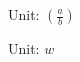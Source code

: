 \documentclass{ctexart}
\begin{document}
Unit: $ \left(\frac{a}{b}\right)$

Unit: $ w$
\end{document}
